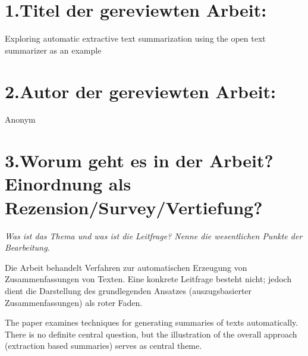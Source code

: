 \documentclass{article}
\begin{document}
\mdxtitleblockstart{}
\mdtitleauthorrunning{}{}\mdxtitleblockend%

\section{1.\hspace*{0.5em}Titel der gereviewten Arbeit:}\label{sec-titel-der-gereviewten-arbeit-}%

\noindent{}  Exploring automatic extractive text summarization using the open text
  summarizer as an example%

\section{2.\hspace*{0.5em}Autor der gereviewten Arbeit:}\label{sec-autor-der-gereviewten-arbeit-}%

\noindent{}  Anonym%

\section{3.\hspace*{0.5em}Worum geht es in der Arbeit? Einordnung als Rezension/Survey/Vertiefung?}\label{sec-worum-geht-es-in-der-arbeit-einordnung-als-rezensionsurveyvertiefung}%

\noindent{} \emph{Was ist das Thema und was ist die Leitfrage? Nenne die wesentlichen Punkte der Bearbeitung.}%

Die Arbeit behandelt Verfahren zur automatischen Erzeugung von Zusammenfassungen von Texten. Eine konkrete Leitfrage besteht nicht; jedoch dient die Darstellung des grundlegenden Ansatzes (auszugsbasierter Zusammenfassungen) als roter Faden.%

\mdhr{}%

\noindent{}The paper examines techniques for generating summaries of texts automatically. There is no definite central question, but the illustration of the overall approach (extraction based summaries) serves as central theme.%
\end{document}
